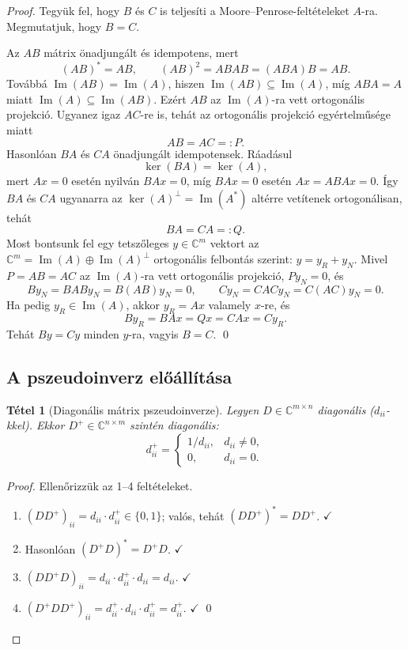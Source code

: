 \documentclass[a4paper,12pt]{article}
\theoremstyle{mydef}
\newtheorem{tetel}{Tétel}[section]
\newcommand{\C}{\mathbb{C}}
\DeclareMathOperator{\Ker}{ker}
\DeclareMathOperator{\Kep}{Im}
\begin{document}
\begin{proof}
Tegyük fel, hogy $B$ és $C$ is teljesíti a Moore--Penrose-feltételeket $A$-ra.
Megmutatjuk, hogy $B=C$.

Az $AB$ mátrix önadjungált és idempotens, mert
\[
  (AB)^*=AB, \qquad (AB)^2=ABAB=(ABA)B=AB.
\]
Továbbá $\Kep(AB)=\Kep(A)$, hiszen $\Kep(AB)\subseteq\Kep(A)$, míg
$ABA=A$ miatt $\Kep(A)\subseteq\Kep(AB)$. Ezért $AB$ az $\Kep(A)$-ra vett
ortogonális projekció. Ugyanez igaz $AC$-re is, tehát az ortogonális projekció
egyértelműsége miatt
\[
  AB=AC=:P.
\]
Hasonlóan $BA$ és $CA$ önadjungált idempotensek. Ráadásul
\[
  \Ker(BA)=\Ker(A),
\]
mert $Ax=0$ esetén nyilván $BAx=0$, míg $BAx=0$ esetén
$Ax=ABAx=0$. Így $BA$ és $CA$ ugyanarra az $\Ker(A)^\perp=\Kep(A^*)$ altérre
vetítenek ortogonálisan, tehát
\[
  BA=CA=:Q.
\]
Most bontsunk fel egy tetszőleges $y\in\C^m$ vektort az
$\C^m=\Kep(A)\oplus\Kep(A)^\perp$ ortogonális felbontás szerint: $y=y_R+y_N$.
Mivel $P=AB=AC$ az $\Kep(A)$-ra vett ortogonális projekció, $Py_N=0$, és
\[
  By_N=BAB y_N=B(AB)y_N=0,
  \qquad
  Cy_N=CAC y_N=C(AC)y_N=0.
\]
Ha pedig $y_R\in\Kep(A)$, akkor $y_R=Ax$ valamely $x$-re, és
\[
  By_R=BAx=Qx=CAx=Cy_R.
\]
Tehát $By=Cy$ minden $y$-ra, vagyis $B=C$. \qed
\end{proof}

\subsection*{A pszeudoinverz előállítása}

\begin{mdframed}[backgroundcolor=thmbg,linewidth=0pt,innertopmargin=8pt,innerbottommargin=8pt]
\begin{tetel}[Diagonális mátrix pszeudoinverze]
\label{tetel:diagpseudo}
Legyen $D \in \C^{m\times n}$ diagonális ($d_{ii}$-kkel). Ekkor $D^+ \in \C^{n\times m}$
szintén diagonális:
\[
  d_{ii}^+ = \begin{cases} 1/d_{ii}, & d_{ii} \ne 0, \\ 0, & d_{ii} = 0. \end{cases}
\]
\end{tetel}
\end{mdframed}

\begin{proof}
Ellenőrizzük az 1--4 feltételeket.
\begin{enumerate}[noitemsep,topsep=2pt]
  \item $(DD^+)_{ii} = d_{ii}\cdot d_{ii}^+ \in \{0, 1\}$; valós, tehát $(DD^+)^* = DD^+$. $\checkmark$
  \item Hasonlóan $(D^+D)^* = D^+D$. $\checkmark$
  \item $(DD^+D)_{ii} = d_{ii}\cdot d_{ii}^+\cdot d_{ii} = d_{ii}$. $\checkmark$
  \item $(D^+DD^+)_{ii} = d_{ii}^+\cdot d_{ii}\cdot d_{ii}^+ = d_{ii}^+$. $\checkmark$ \qed
\end{enumerate}
\end{proof}
\end{document}
